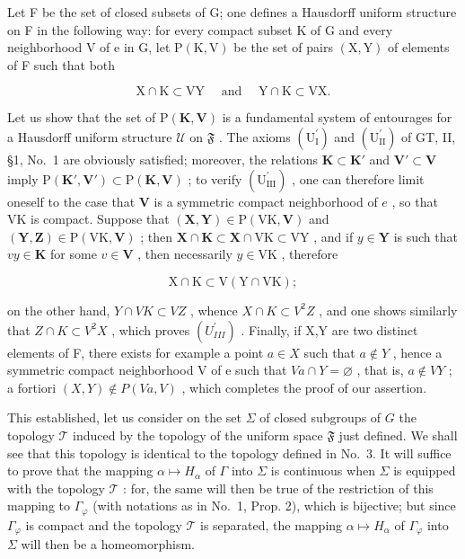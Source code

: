 Let F be the set of closed subsets of G; one defines a Hausdorff uniform structure on F in the following way: for every compact subset K of G and every neighborhood V of e in G, let \(\mathrm{P}(\mathrm{K},\mathrm{V})\) be the set of pairs \((\mathrm{X},\mathrm{Y})\) of elements of F such that both

\[
\mathrm{X} \cap \mathrm{K} \subset \mathrm{VY} \quad \text { and } \quad \mathrm{Y} \cap \mathrm{K} \subset \mathrm{VX}.\tag{9}
\]

Let us show that the set of \(\mathrm{P}(\mathbf{K},\mathbf{V})\) is a fundamental system of entourages for a Hausdorff uniform structure \(\mathcal{U}\) on \(\mathfrak{F}\) . The axioms \((\mathrm{U}_{\mathrm{I}}^{\prime})\) and \((\mathrm{U}_{\mathrm{II}}^{\prime})\) of GT, II, §1, No.~1 are obviously satisfied; moreover, the relations \(\mathbf{K} \subset \mathbf{K}'\) and \(\mathbf{V}' \subset \mathbf{V}\) imply \(\mathrm{P}(\mathbf{K}',\mathbf{V}') \subset \mathrm{P}(\mathbf{K},\mathbf{V})\) ; to verify \((\mathrm{U}_{\mathrm{III}}^{\prime})\) , one can therefore limit oneself to the case that \(\mathbf{V}\) is a symmetric compact neighborhood of \(e\) , so that VK is compact. Suppose that \((\mathbf{X},\mathbf{Y}) \in \mathrm{P}(\mathrm{VK},\mathbf{V})\) and \((\mathbf{Y},\mathbf{Z}) \in \mathrm{P}(\mathrm{VK},\mathbf{V})\) ; then \(\mathbf{X} \cap \mathbf{K} \subset \mathbf{X} \cap \mathrm{VK} \subset \mathrm{VY}\) , and if \(y \in \mathbf{Y}\) is such that \(vy \in \mathbf{K}\) for some \(v \in \mathbf{V}\) , then necessarily \(y \in \mathrm{VK}\) , therefore

\[
\mathrm{X} \cap \mathrm{K} \subset \mathrm{V} (\mathrm{Y} \cap \mathrm{VK});
\]

on the other hand, \(Y \cap VK \subset VZ\) , whence \(X \cap K \subset V^{2}Z\) , and one shows similarly that \(Z \cap K \subset V^{2}X\) , which proves \((U_{III}^{\prime})\) . Finally, if X,Y are two distinct elements of F, there exists for example a point \(a \in X\) such that \(a \notin Y\) , hence a symmetric compact neighborhood V of e such that \(Va \cap Y = \varnothing\) , that is, \(a \notin VY\) ; a fortiori \((X,Y) \notin P(Va,V)\) , which completes the proof of our assertion.

This established, let us consider on the set \(\Sigma\) of closed subgroups of \(G\) the topology \(\mathcal{T}\) induced by the topology of the uniform space \(\mathfrak{F}\) just defined. We shall see that this topology is identical to the topology defined in No.~3. It will suffice to prove that the mapping \(\alpha \mapsto H_{\alpha}\) of \(\Gamma\) into \(\Sigma\) is continuous when \(\Sigma\) is equipped with the topology \(\mathcal{T}\) : for, the same will then be true of the restriction of this mapping to \(\Gamma_{\varphi}\) (with notations as in No.~1, Prop. 2), which is bijective; but since \(\Gamma_{\varphi}\) is compact and the topology \(\mathcal{T}\) is separated, the mapping \(\alpha \mapsto H_{\alpha}\) of \(\Gamma_{\varphi}\) into \(\Sigma\) will then be a homeomorphism.

